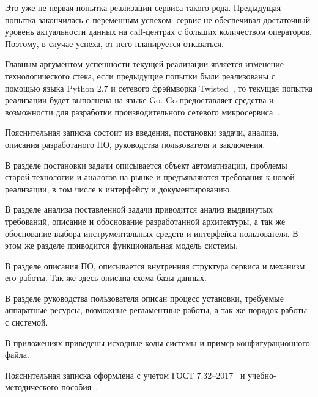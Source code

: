 Это уже не первая попытка реализации сервиса такого рода.
Предыдущая попытка закончилась с переменным успехом: сервис не обеспечивал достаточный уровень актуальности данных
на call-центрах с больших количеством операторов.
Поэтому, в случае успеха, от него планируется отказаться.

Главным аргументом успешности текущей реализации является изменение технологического стека,
если предыдущие попытки были реализованы с помощью языка Python 2.7 и сетевого фрэймворка Twisted~\cite{info:twisted}, %
то текущая попытка реализации будет выполнена на языке Go.
Go предоставляет средства и возможности для разработки производительного сетевого микросервиса~\cite{youtube:go}.

Пояснительная записка состоит из введения, постановки задачи, анализа, описания разработаного ПО, руководства пользователя и заключения.

В разделе постановки задачи описывается объект автоматизации, проблемы старой технологии и аналогов на рынке
и предъявляются требования к новой реализации, в том числе к интерфейсу и документированию.

В разделе анализа поставленной задачи приводится анализ выдвинутых требований,
описание и обоснование разработанной архитектуры,
а так же обоснование выбора инструментальных средств и интерфейса пользователя.
В этом же разделе приводится функциональная модель системы.

В разделе описания ПО, описывается внутренняя структура сервиса и механизм его работы.
Так же здесь описана схема базы данных.

В разделе руководства пользователя описан процесс установки, требуемые аппаратные ресурсы, возможные регламентные работы,
а так же порядок работы с системой.

В приложениях приведены исходные коды системы и пример конфигурационного файла.

Пояснительная записка оформлена с учетом ГОСТ 7.32--2017~\cite{gost732} и учебно-методического пособия~\cite{smp}.
